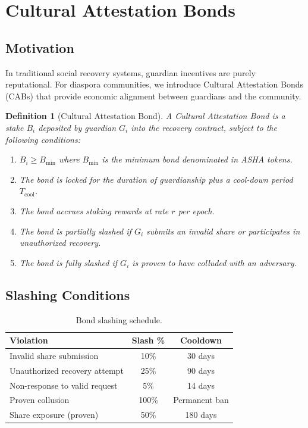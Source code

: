 \documentclass[11pt,a4paper,twocolumn]{article}
\newtheorem{definition}[theorem]{Definition}
\begin{document}
\section{Cultural Attestation Bonds}\label{sec:bonds}

\subsection{Motivation}

In traditional social recovery systems, guardian incentives are purely reputational. For diaspora communities, we introduce Cultural Attestation Bonds (CABs) that provide economic alignment between guardians and the community.

\begin{definition}[Cultural Attestation Bond]
A Cultural Attestation Bond is a stake $B_i$ deposited by guardian $G_i$ into the recovery contract, subject to the following conditions:
\begin{enumerate}
  \item $B_i \geq B_{\min}$ where $B_{\min}$ is the minimum bond denominated in ASHA tokens.
  \item The bond is locked for the duration of guardianship plus a cool-down period $T_{\text{cool}}$.
  \item The bond accrues staking rewards at rate $r$ per epoch.
  \item The bond is partially slashed if $G_i$ submits an invalid share or participates in unauthorized recovery.
  \item The bond is fully slashed if $G_i$ is proven to have colluded with an adversary.
\end{enumerate}
\end{definition}

\subsection{Slashing Conditions}

\begin{table}[H]
\centering
\caption{Bond slashing schedule.}
\label{tab:slashing}
\begin{tabular}{@{}lcc@{}}
\toprule
\textbf{Violation} & \textbf{Slash \%} & \textbf{Cooldown} \\
\midrule
Invalid share submission & 10\% & 30 days \\
Unauthorized recovery attempt & 25\% & 90 days \\
Non-response to valid request & 5\% & 14 days \\
Proven collusion & 100\% & Permanent ban \\
Share exposure (proven) & 50\% & 180 days \\
\bottomrule
\end{tabular}
\end{table}
\end{document}
